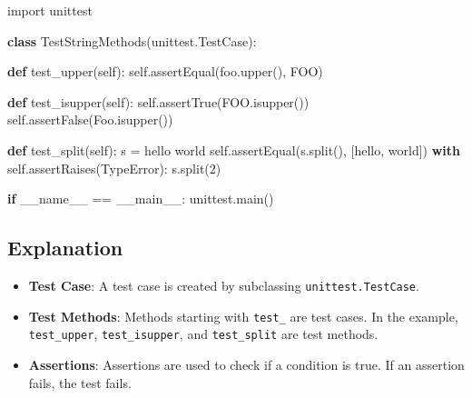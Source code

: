 \documentclass[
  letterpaper,
  DIV=11,
  numbers=noendperiod]{scrreprt}
\newenvironment{Shaded}{\begin{snugshade}}{\end{snugshade}}
\newcommand{\ControlFlowTok}[1]{\textcolor[rgb]{0.00,0.23,0.31}{\textbf{#1}}}
\newcommand{\DecValTok}[1]{\textcolor[rgb]{0.68,0.00,0.00}{#1}}
\newcommand{\ImportTok}[1]{\textcolor[rgb]{0.00,0.46,0.62}{#1}}
\newcommand{\KeywordTok}[1]{\textcolor[rgb]{0.00,0.23,0.31}{\textbf{#1}}}
\newcommand{\NormalTok}[1]{\textcolor[rgb]{0.00,0.23,0.31}{#1}}
\newcommand{\OperatorTok}[1]{\textcolor[rgb]{0.37,0.37,0.37}{#1}}
\newcommand{\PreprocessorTok}[1]{\textcolor[rgb]{0.68,0.00,0.00}{#1}}
\newcommand{\StringTok}[1]{\textcolor[rgb]{0.13,0.47,0.30}{#1}}
\newcommand{\VariableTok}[1]{\textcolor[rgb]{0.07,0.07,0.07}{#1}}
\providecommand{\tightlist}{%
  \setlength{\itemsep}{0pt}\setlength{\parskip}{0pt}}\usepackage{longtable,booktabs,array}
\begin{document}
\begin{Shaded}
\begin{Highlighting}[]
\ImportTok{import}\NormalTok{ unittest}

\KeywordTok{class}\NormalTok{ TestStringMethods(unittest.TestCase):}

    \KeywordTok{def}\NormalTok{ test\_upper(}\VariableTok{self}\NormalTok{):}
        \VariableTok{self}\NormalTok{.assertEqual(}\StringTok{\textquotesingle{}foo\textquotesingle{}}\NormalTok{.upper(), }\StringTok{\textquotesingle{}FOO\textquotesingle{}}\NormalTok{)}

    \KeywordTok{def}\NormalTok{ test\_isupper(}\VariableTok{self}\NormalTok{):}
        \VariableTok{self}\NormalTok{.assertTrue(}\StringTok{\textquotesingle{}FOO\textquotesingle{}}\NormalTok{.isupper())}
        \VariableTok{self}\NormalTok{.assertFalse(}\StringTok{\textquotesingle{}Foo\textquotesingle{}}\NormalTok{.isupper())}

    \KeywordTok{def}\NormalTok{ test\_split(}\VariableTok{self}\NormalTok{):}
\NormalTok{        s }\OperatorTok{=} \StringTok{\textquotesingle{}hello world\textquotesingle{}}
        \VariableTok{self}\NormalTok{.assertEqual(s.split(), [}\StringTok{\textquotesingle{}hello\textquotesingle{}}\NormalTok{, }\StringTok{\textquotesingle{}world\textquotesingle{}}\NormalTok{])}
        \ControlFlowTok{with} \VariableTok{self}\NormalTok{.assertRaises(}\PreprocessorTok{TypeError}\NormalTok{):}
\NormalTok{            s.split(}\DecValTok{2}\NormalTok{)}

\ControlFlowTok{if} \VariableTok{\_\_name\_\_} \OperatorTok{==} \StringTok{\textquotesingle{}\_\_main\_\_\textquotesingle{}}\NormalTok{:}
\NormalTok{    unittest.main()}
\end{Highlighting}
\end{Shaded}

\subsection{Explanation}\label{explanation}

\begin{itemize}
\tightlist
\item
  \textbf{Test Case}: A test case is created by subclassing
  \texttt{unittest.TestCase}.
\item
  \textbf{Test Methods}: Methods starting with \texttt{test\_} are test
  cases. In the example, \texttt{test\_upper}, \texttt{test\_isupper},
  and \texttt{test\_split} are test methods.
\item
  \textbf{Assertions}: Assertions are used to check if a condition is
  true. If an assertion fails, the test fails.
\end{itemize}
\end{document}
